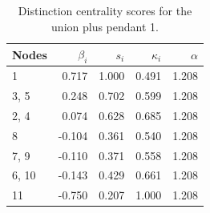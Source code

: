 \begin{table}
\centering
\caption{\label{tab:unionpendant1}Distinction centrality scores for the union plus pendant 1.}
\centering
\begin{tabular}[t]{lrrrr}
\toprule
Nodes & $\beta_i$ & $s_i$ & $\kappa_i$ & $\alpha$\\
\midrule
1 & 0.717 & 1.000 & 0.491 & 1.208\\
3, 5 & 0.248 & 0.702 & 0.599 & 1.208\\
2, 4 & 0.074 & 0.628 & 0.685 & 1.208\\
8 & -0.104 & 0.361 & 0.540 & 1.208\\
7, 9 & -0.110 & 0.371 & 0.558 & 1.208\\
6, 10 & -0.143 & 0.429 & 0.661 & 1.208\\
11 & -0.750 & 0.207 & 1.000 & 1.208\\
\bottomrule
\end{tabular}
\end{table}
